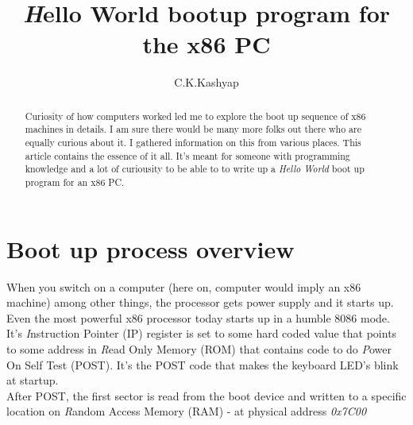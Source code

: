 \documentclass{article}
\begin{document}
\title{{\emph Hello World} bootup program for the x86 PC}
\author{C.K.Kashyap}
\maketitle

\begin{abstract}
Curiosity of how computers worked led me to explore the boot up sequence of x86
machines in details. I am sure there would be many more folks out there who are
equally curious about it. I gathered information on this from various places.
This article contains the essence of it all. It's meant for someone with
programming knowledge and a lot of curiousity to be able to to write up a
{\it Hello World} boot up program for an x86 PC.
\end{abstract}

\section*{Boot up process overview} When you switch on a computer (here on,
		computer would imply an x86 machine) among other things, the
processor gets power supply and it starts up.  Even the most powerful x86
processor today starts up in a humble 8086 mode. It's {\emph Instruction
	Pointer (IP)} register is set to some hard coded value that points to
	some address in {\emph Read Only Memory (ROM)} that contains code to do {\emph Power On Self Test (POST)}. It's the POST code that makes the keyboard LED's blink at startup.\\
		After POST, the first sector is read from the boot device and written to a specific location on {\emph Random Access Memory (RAM)} - at physical address {\it0x7C00}
\end{document}
